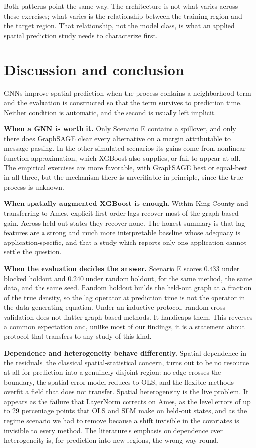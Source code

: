 \documentclass[ASNA, twocolumn]{USG} %
\begin{document}
Both patterns point the same way. The architecture is not what varies across these exercises; what varies is the relationship between the training region and the target region. That relationship, not the model class, is what an applied spatial prediction study needs to characterize first.

\section{Discussion and conclusion}
\label{sec:conclusion}

GNNs improve spatial prediction when the process contains a neighborhood term and the evaluation is constructed so that the term survives to prediction time. Neither condition is automatic, and the second is usually left implicit.

\textbf{When a GNN is worth it.} Only Scenario E contains a spillover, and only there does GraphSAGE clear every alternative on a margin attributable to message passing. In the other simulated scenarios its gains come from nonlinear function approximation, which XGBoost also supplies, or fail to appear at all. The empirical exercises are more favorable, with GraphSAGE best or equal-best in all three, but the mechanism there is unverifiable in principle, since the true process is unknown.

\textbf{When spatially augmented XGBoost is enough.} Within King County and transferring to Ames, explicit first-order lags recover most of the graph-based gain. Across held-out states they recover none. The honest summary is that lag features are a strong and much more interpretable baseline whose adequacy is application-specific, and that a study which reports only one application cannot settle the question.

\textbf{When the evaluation decides the answer.} Scenario E scores \(0.433\) under blocked holdout and \(0.240\) under random holdout, for the same method, the same data, and the same seed. Random holdout builds the held-out graph at a fraction of the true density, so the lag operator at prediction time is not the operator in the data-generating equation. Under an inductive protocol, random cross-validation does not flatter graph-based methods. It handicaps them. This reverses a common expectation and, unlike most of our findings, it is a statement about protocol that transfers to any study of this kind.

\textbf{Dependence and heterogeneity behave differently.} Spatial dependence in the residuals, the classical spatial-statistical concern, turns out to be no resource at all for prediction into a genuinely disjoint region: no edge crosses the boundary, the spatial error model reduces to OLS, and the flexible methods overfit a field that does not transfer. Spatial heterogeneity is the live problem. It appears as the failure that LayerNorm corrects on Ames, as the level errors of up to 29 percentage points that OLS and SEM make on held-out states, and as the regime scenario we had to remove because a shift invisible in the covariates is invisible to every method. The literature's emphasis on dependence over heterogeneity is, for prediction into new regions, the wrong way round.

\nocite{*}%
\end{document}
